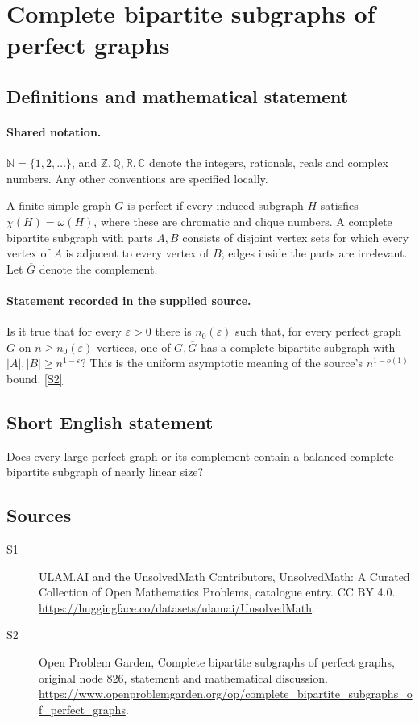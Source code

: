 \documentclass[11pt]{article}
\newcommand{\sref}[2]{\hyperlink{source:#1:#2}{[S#2]}}
\begin{document}
\section{Complete bipartite subgraphs of perfect graphs}\label{statement}

\subsection{Definitions and mathematical statement}

\paragraph{Shared notation.}$\mathbb N=\{1,2,\ldots\}$, and $\mathbb Z,\mathbb Q,\mathbb R,\mathbb C$ denote the integers, rationals, reals and complex numbers. Any other conventions are specified locally.


A finite simple graph $G$ is perfect if every induced subgraph $H$ satisfies $\chi(H)=\omega(H)$, where these are chromatic and clique numbers. A complete bipartite subgraph with parts $A,B$ consists of disjoint vertex sets for which every vertex of $A$ is adjacent to every vertex of $B$; edges inside the parts are irrelevant. Let $\overline G$ denote the complement.
\paragraph{Statement recorded in the supplied source.}
Is it true that for every $\varepsilon>0$ there is $n_0(\varepsilon)$ such that, for every perfect graph $G$ on $n\ge n_0(\varepsilon)$ vertices, one of $G,\overline G$ has a complete bipartite subgraph with $|A|,|B|\ge n^{1-\varepsilon}$? This is the uniform asymptotic meaning of the source's $n^{1-o(1)}$ bound. \sref{statement}{2}
\subsection{Short English statement}
Does every large perfect graph or its complement contain a balanced complete bipartite subgraph of nearly linear size?
\subsection{Sources}
\begin{description}
\item[\hypertarget{source:statement:1}{S1}] ULAM.AI and the UnsolvedMath Contributors, UnsolvedMath: A Curated Collection of Open Mathematics Problems, catalogue entry. CC BY 4.0. \url{https://huggingface.co/datasets/ulamai/UnsolvedMath}.
\item[\hypertarget{source:statement:2}{S2}] Open Problem Garden, Complete bipartite subgraphs of perfect graphs, original node 826, statement and mathematical discussion. \url{https://www.openproblemgarden.org/op/complete_bipartite_subgraphs_of_perfect_graphs}.
\end{description}
\label{end:statement}
\end{document}
